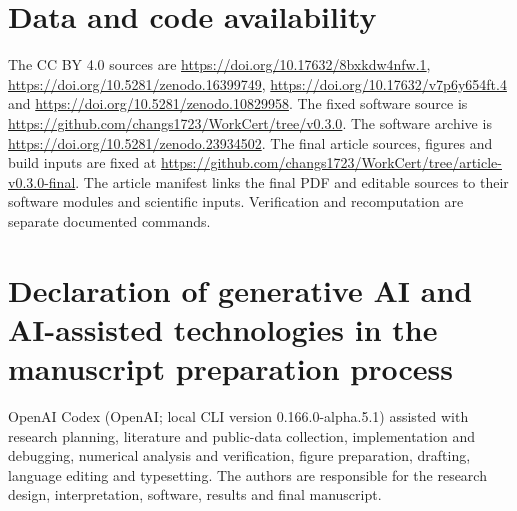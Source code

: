 \documentclass[preprint,12pt,a4paper]{elsarticle}
\begin{document}
\section*{Data and code availability}
The CC BY 4.0 sources are \url{https://doi.org/10.17632/8bxkdw4nfw.1}, \url{https://doi.org/10.5281/zenodo.16399749}, \url{https://doi.org/10.17632/v7p6y654ft.4} and \url{https://doi.org/10.5281/zenodo.10829958}. The fixed software source is \url{https://github.com/changs1723/WorkCert/tree/v0.3.0}. The software archive is \url{https://doi.org/10.5281/zenodo.23934502}.  The final article sources, figures and build inputs are fixed at \url{https://github.com/changs1723/WorkCert/tree/article-v0.3.0-final}.  The article manifest links the final PDF and editable sources to their software modules and scientific inputs. Verification and recomputation are separate documented commands.
\section*{Declaration of generative AI and AI-assisted technologies in the manuscript preparation process}
OpenAI Codex (OpenAI; local CLI version 0.166.0-alpha.5.1) assisted with research planning, literature and public-data collection, implementation and debugging, numerical analysis and verification, figure preparation, drafting, language editing and typesetting. The authors are responsible for the research design, interpretation, software, results and final manuscript.
{\small}
\end{document}
